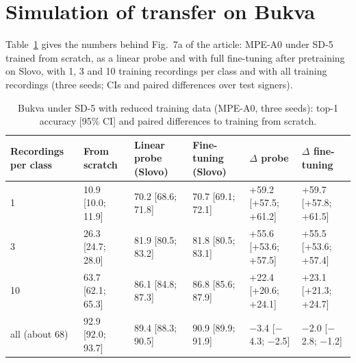 \documentclass[a4paper,10pt]{article}
\begin{document}
\section{Simulation of transfer on Bukva}
Table~\ref{tab:s_few} gives the numbers behind Fig.~7a of the article: MPE-A0 under SD-5 trained from scratch, as a linear probe and with full fine-tuning after pretraining on Slovo, with 1, 3 and 10 training recordings per class and with all training recordings (three seeds; CIs and paired differences over test signers).
\begin{table}[H]
\caption{Bukva under SD-5 with reduced training data (MPE-A0, three seeds): top-1 accuracy [95\% CI] and paired differences to training from scratch.}\label{tab:s_few}
\centering
\scriptsize\setlength{\tabcolsep}{3pt}
\begin{tabular}{llllll}
\toprule
\textbf{Recordings per class} & \textbf{From scratch} & \textbf{Linear probe (Slovo)} & \textbf{Fine-tuning (Slovo)} & \textbf{$\Delta$ probe} & \textbf{$\Delta$ fine-tuning} \\
\midrule
1 & 10.9 [10.0; 11.9] & 70.2 [68.6; 71.8] & 70.7 [69.1; 72.1] & +59.2 [+57.5; +61.2] & +59.7 [+57.8; +61.5] \\
3 & 26.3 [24.7; 28.0] & 81.9 [80.5; 83.2] & 81.8 [80.5; 83.1] & +55.6 [+53.6; +57.5] & +55.5 [+53.6; +57.4] \\
10 & 63.7 [62.1; 65.3] & 86.1 [84.8; 87.3] & 86.8 [85.6; 87.9] & +22.4 [+20.6; +24.1] & +23.1 [+21.3; +24.7] \\
all (about 68) & 92.9 [92.0; 93.7] & 89.4 [88.3; 90.5] & 90.9 [89.9; 91.9] & $-$3.4 [$-$4.3; $-$2.5] & $-$2.0 [$-$2.8; $-$1.2] \\
\bottomrule
\end{tabular}
\end{table}
\end{document}
